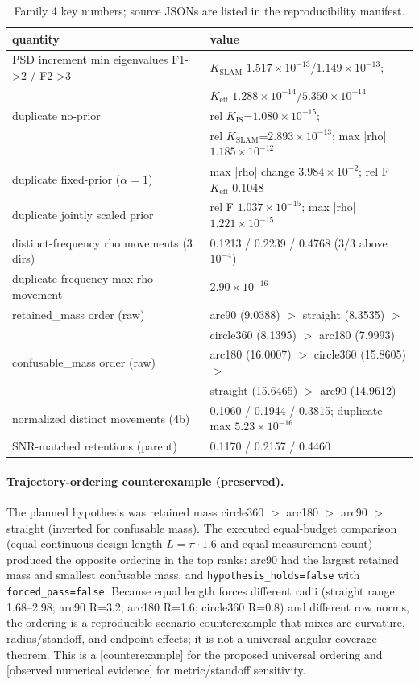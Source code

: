 \documentclass[12pt]{article}
\newcommand{\OBS}{\textnormal{[observed numerical evidence]}}
\newcommand{\CTX}{\textnormal{[counterexample]}}
\begin{document}
\begin{table}[ht]
\centering
\small
\caption{Family 4 key numbers; source JSONs are listed in the reproducibility
manifest.}
\label{tab:f4}
\begin{tabular}{p{} p{}}
\toprule
quantity & value \\
\midrule
PSD increment min eigenvalues F1->2 / F2->3 &
$K_{\mathrm{SLAM}}$ $1.517\times10^{-13}$/$1.149\times10^{-13}$; \\
 & $K_{\mathrm{eff}}$ $1.288\times10^{-14}$/$5.350\times10^{-14}$ \\
duplicate no-prior & rel $K_{\mathrm{IS}}$=$1.080\times10^{-15}$; \\
 & rel $K_{\mathrm{SLAM}}$=$2.893\times10^{-13}$; max |rho| $1.185\times10^{-12}$ \\
duplicate fixed-prior ($\alpha=1$) &
max |rho| change $3.984\times10^{-2}$; rel F $K_{\mathrm{eff}}$ 0.1048 \\
duplicate jointly scaled prior &
rel F $1.037\times10^{-15}$; max |rho| $1.221\times10^{-15}$ \\
distinct-frequency rho movements (3 dirs) &
0.1213 / 0.2239 / 0.4768 (3/3 above $10^{-4}$) \\
duplicate-frequency max rho movement & $2.90\times10^{-16}$ \\
retained\_mass order (raw) &
arc90 (9.0388) $>$ straight (8.3535) $>$ \\
 & circle360 (8.1395) $>$ arc180 (7.9993) \\
confusable\_mass order (raw) &
arc180 (16.0007) $>$ circle360 (15.8605) $>$ \\
 & straight (15.6465) $>$ arc90 (14.9612) \\
normalized distinct movements (4b) &
0.1060 / 0.1944 / 0.3815; duplicate max $5.23\times10^{-16}$ \\
SNR-matched retentions (parent) & 0.1170 / 0.2157 / 0.4460 \\
\bottomrule
\end{tabular}
\end{table}

\paragraph{Trajectory-ordering counterexample (preserved).}
The planned hypothesis was retained mass
circle360 $>$ arc180 $>$ arc90 $>$ straight (inverted for confusable mass).
The executed equal-budget comparison (equal continuous design length
$L=\pi\cdot1.6$ and equal measurement count) produced the opposite ordering in
the top ranks: arc90 had the largest retained mass and smallest
confusable mass, and \texttt{hypothesis\_holds=false} with \texttt{forced\_pass=false}.
Because equal length forces different radii (straight range 1.68--2.98;
arc90 R=3.2; arc180 R=1.6; circle360 R=0.8) and different row norms, the
ordering is a reproducible scenario counterexample that mixes arc curvature,
radius/standoff, and endpoint effects; it is not a universal angular-coverage
theorem. This is a \CTX{} for the proposed universal ordering and \OBS{} for
metric/standoff sensitivity.
\end{document}

